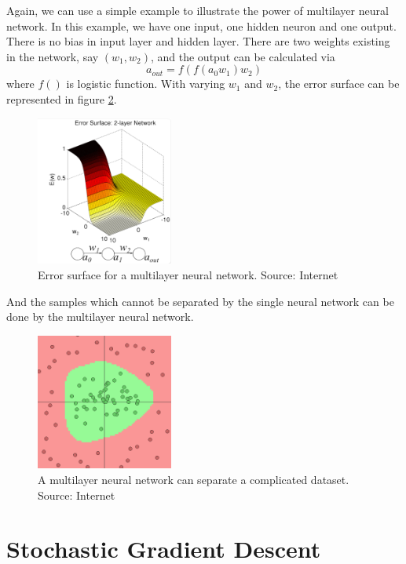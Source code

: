 Again, we can use a simple example to illustrate the power of multilayer neural network. In this example, we have one input, one hidden neuron and one output. There is no bias in input layer and hidden layer. There are two weights existing in the network, say $(w_{1}, w_{2})$, and the output can be calculated via
\begin{equation}\label{eq:2LayerExample}
a_{out} = f(f(a_{0}w_{1})w_{2})
\end{equation}
where $f()$ is logistic function. With varying $w_{1}$ and $w_{2}$, the error surface can be represented in figure \ref{fig:2LayerErrorSurface}.
\graphicspath{ {./Figures/} }
\begin{figure}[!htb]
\centering
\includegraphics[width=0.4\textwidth]{2LayerErrorSurface.png}
\caption{\label{fig:2LayerErrorSurface}Error surface for a multilayer neural network. Source: Internet}
\end{figure}
And the samples which cannot be separated by the single neural network can be done by the multilayer neural network.
\graphicspath{ {./Figures/} }
\begin{figure}[!htb]
\centering
\includegraphics[width=0.4\textwidth]{MultiLayerCircleData.png}
\caption{\label{fig:2LayerErrorSurface}A multilayer neural network can separate a complicated dataset. Source: Internet}
\end{figure}

\section{Stochastic Gradient Descent}

